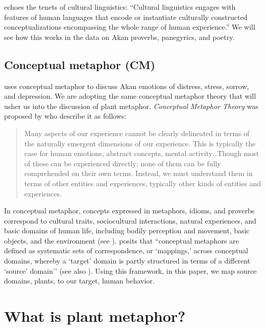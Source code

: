 \documentclass[output=paper,colorlinks,citecolor=brown]{langscibook}
\begin{document}
\citet[2]{Sharifian2017} echoes the tenets of cultural linguistics: ``Cultural linguistics engages with features of human languages that encode or instantiate culturally constructed conceptualizations encompassing the whole range of human experience.'' We will see how this works in the data on Akan proverbs, panegyrics, and poetry. 

\subsection{Conceptual metaphor (CM)}

\citet{Agyekum2020} uses conceptual metaphor to discuss Akan emotions of distress, stress, sorrow, and depression. We are adopting the same conceptual meta\-phor theory that will usher us into the discussion of plant metaphor. \textit{Conceptual Metaphor Theory} was proposed by \citet[177]{LakoffandJohnson1980} who describe it as follows: 

\begin{quote}
    Many aspects of our experience cannot be clearly delineated in terms of the naturally emergent dimensions of our experience. This is typically the case for human emotions, abstract concepts, mental activity{\dots}Though most of these can be experienced directly; none of them can be fully comprehended on their own terms. Instead, we must understand them in terms of other entities and experiences, typically other kinds of entities and experiences.
\end{quote}

\begin{sloppypar}
In conceptual metaphor, concepts expressed in metaphors, idioms, and proverbs correspond to cultural traits, sociocultural interactions, natural experiences, and basic domains of human life, including bodily perception and movement, basic objects, and the environment (see \cite{LakoffandJohnson1980}). \citet[5]{Semino2008} posits that ``conceptual metaphors are defined as systematic sets of correspondence, or `mappings,’ across conceptual domains, whereby a `target' domain is partly structured in terms of a different `source' domain'' (see also \cite{Kövecses2002}). Using this framework, in this paper, we map source domains, plants, to our target, human behavior. 
\end{sloppypar}

\section{What is plant metaphor?} \label{07_WhatIs}
\end{document}
